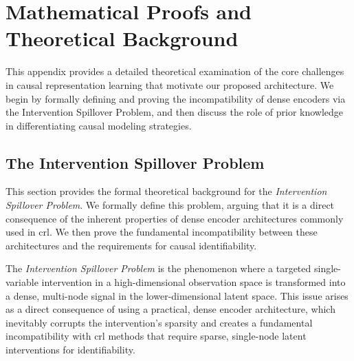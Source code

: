 \section{Mathematical Proofs and Theoretical Background}
\label{app:proofs}

This appendix provides a detailed theoretical examination of the core challenges in causal representation learning that motivate our proposed architecture.
We begin by formally defining and proving the incompatibility of dense encoders via the Intervention Spillover Problem, and then discuss the role of prior knowledge in differentiating causal modeling strategies.

\subsection{The Intervention Spillover Problem}
\label{app:proofs:spillover}

This section provides the formal theoretical background for the \emph{Intervention Spillover Problem}.
We formally define this problem, arguing that it is a direct consequence of the inherent properties of dense encoder architectures commonly used in \gls{crl}.
We then prove the fundamental incompatibility between these architectures and the requirements for causal identifiability.

\begin{definition}
\label{def:app:intervention_spillover_problem}
The \emph{Intervention Spillover Problem} is the phenomenon where a targeted single-variable intervention in a high-dimensional observation space is transformed into a dense, multi-node signal in the lower-dimensional latent space.
This issue arises as a direct consequence of using a practical, dense encoder architecture, which inevitably corrupts the intervention's sparsity and creates a fundamental incompatibility with \gls{crl} methods that require sparse, single-node latent interventions for identifiability.
\end{definition}

